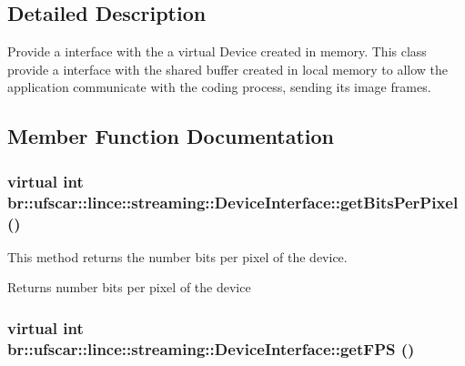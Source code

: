 \subsection{Detailed Description}
Provide a interface with the a virtual Device created in memory. This class provide a interface with the shared buffer created in local memory to allow the application communicate with the coding process, sending its image frames. 

\subsection{Member Function Documentation}
\hypertarget{classbr_1_1ufscar_1_1lince_1_1streaming_1_1DeviceInterface_ae792aa4c26dfc014c9de2939af442339}{
\subsubsection[{getBitsPerPixel}]{\setlength{\rightskip}{0pt plus 5cm}virtual int br::ufscar::lince::streaming::DeviceInterface::getBitsPerPixel ()}}
\label{classbr_1_1ufscar_1_1lince_1_1streaming_1_1DeviceInterface_ae792aa4c26dfc014c9de2939af442339}


This method returns the number bits per pixel of the device. 

\begin{DoxyReturn}{Returns}
number bits per pixel of the device 
\end{DoxyReturn}
\hypertarget{classbr_1_1ufscar_1_1lince_1_1streaming_1_1DeviceInterface_a4b067b1b359ab0b63caf177f2512dfcb}{
\subsubsection[{getFPS}]{\setlength{\rightskip}{0pt plus 5cm}virtual int br::ufscar::lince::streaming::DeviceInterface::getFPS ()}}
\label{classbr_1_1ufscar_1_1lince_1_1streaming_1_1DeviceInterface_a4b067b1b359ab0b63caf177f2512dfcb}


